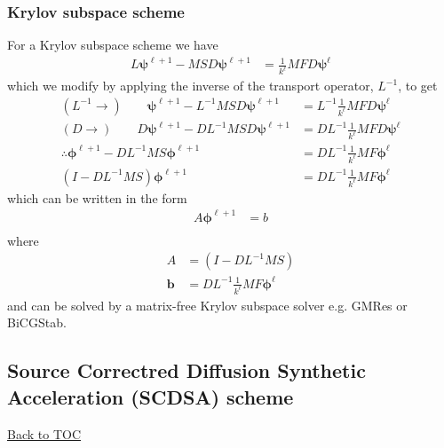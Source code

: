 \documentclass[11pt,letterpaper,notitlepage]{article}
\newcommand{\beqn}{\begin{equation}
		\begin{aligned}}
\newcommand{\eeqn}{\end{aligned}
\end{equation}}
\numberwithin{equation}{section}
\newcommand{\Linv}{L^{-1}}
\newcommand{\bphi}{\boldsymbol{\phi}}
\newcommand{\bpsi}{\boldsymbol{\psi}}
\newcommand{\BackToTOC}{\hyperlink{toc}{\scriptsize{\color{blue}Back to TOC}}\newline}
\begin{document}
\subsubsection{Krylov subspace scheme}
For a Krylov subspace scheme we have
\beqn 
L\bpsi^{\ell+1} - MSD\bpsi^{\ell+1} &=  \frac{1}{k^\ell} MFD\bpsi^{\ell}
\eeqn 
which we modify by applying the inverse of the transport operator, $\Linv$, to get
\beqn 
(\Linv \to) \quad \quad 
\bpsi^{\ell+1} - \Linv MSD\bpsi^{\ell+1} &=  \Linv \frac{1}{k^\ell} MFD\bpsi^{\ell} \\
(D \to) \quad \quad 
D\bpsi^{\ell+1} - D\Linv MSD\bpsi^{\ell+1} &=  D\Linv \frac{1}{k^\ell} MFD\bpsi^{\ell}\\
\therefore
\bphi^{\ell+1} - D\Linv MS\bphi^{\ell+1} &=  D\Linv \frac{1}{k^\ell} MF\bphi^{\ell}\\
(I - D\Linv MS) \bphi^{\ell+1} &= D\Linv \frac{1}{k^\ell} MF\bphi^{\ell}
\eeqn 
which can be written in the form
\beqn 
A \bphi^{\ell+1} &= b \\
\eeqn 
where
\beqn
A & = (I - D\Linv MS) \\
\mathbf{b} &= D\Linv \frac{1}{k^\ell} MF\bphi^{\ell}
\eeqn 
and can be solved by a matrix-free Krylov subspace solver e.g. GMRes or BiCGStab.

\subsection{Source Correctred Diffusion Synthetic Acceleration (SCDSA) scheme}
\BackToTOC
\end{document}
